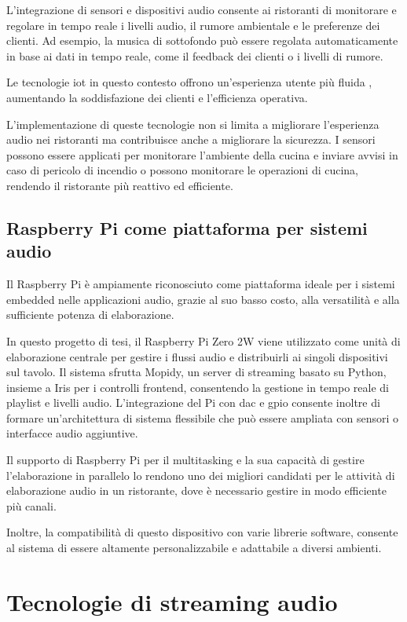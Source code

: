 L'integrazione di sensori e dispositivi audio consente ai ristoranti di monitorare e regolare in tempo reale i livelli audio, il rumore ambientale e le preferenze dei clienti. Ad esempio, la musica di sottofondo può essere regolata automaticamente in base ai dati in tempo reale, come il feedback dei clienti o i livelli di rumore.

Le tecnologie \gls{iot} in questo contesto offrono un'esperienza utente più fluida , aumentando la soddisfazione dei clienti e l'efficienza operativa.

L'implementazione di queste tecnologie non si limita a migliorare l'esperienza audio nei ristoranti ma contribuisce anche a migliorare la sicurezza. I sensori  possono essere applicati per monitorare l'ambiente della cucina e inviare avvisi in caso di pericolo di incendio o possono monitorare le operazioni di cucina, rendendo il ristorante più reattivo ed efficiente.

\subsection{Raspberry Pi come piattaforma per sistemi audio}
\noindent

Il Raspberry Pi è ampiamente riconosciuto come piattaforma ideale per i sistemi embedded nelle applicazioni audio, grazie al suo basso costo, alla versatilità e alla sufficiente potenza di elaborazione.

In questo progetto di tesi, il Raspberry Pi Zero 2W viene utilizzato come unità di elaborazione centrale per gestire i flussi audio e distribuirli ai singoli dispositivi sul tavolo. Il sistema sfrutta Mopidy, un server di streaming basato su Python, insieme a Iris per i controlli frontend, consentendo la gestione in tempo reale di playlist e livelli audio. L'integrazione del Pi con \gls{dac} e \gls{gpio} consente inoltre di formare un'architettura di sistema flessibile che può essere ampliata con sensori o interfacce audio aggiuntive.

Il supporto di Raspberry Pi per il multitasking e la sua capacità di gestire l'elaborazione in parallelo lo rendono uno dei migliori candidati per le attività di elaborazione audio in un ristorante, dove è necessario gestire in modo efficiente più canali.

Inoltre, la compatibilità di questo dispositivo con varie librerie software,  consente al sistema di essere altamente personalizzabile e adattabile a diversi ambienti.

\section{Tecnologie di streaming audio}

